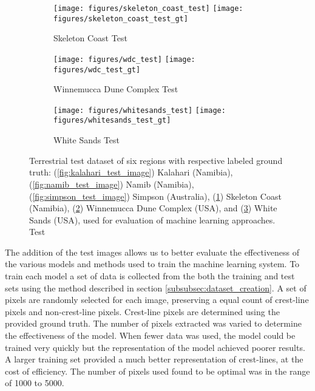 \begin{figure}
	\ContinuedFloat
	\centering
	\begin{subfigure}{\textwidth}
		\centering
		\texttt{[image: figures/skeleton\_coast\_test]}
		\texttt{[image: figures/skeleton\_coast\_test\_gt]}
		\caption{ Skeleton Coast Test }
		\label{fig:skeleton_coast_test_image}
	\end{subfigure}
	\begin{subfigure}{\textwidth}
		\centering
		\texttt{[image: figures/wdc\_test]}
		\texttt{[image: figures/wdc\_test\_gt]}
		\caption{ Winnemucca Dune Complex Test }
		\label{fig:wdc_test_image}
	\end{subfigure}
	\begin{subfigure}{\textwidth}
		\centering
		\texttt{[image: figures/whitesands\_test]}
		\texttt{[image: figures/whitesands\_test\_gt]}
		\caption{ White Sands Test }
		\label{fig:white_sands_test_image}
	\end{subfigure}
	\caption{Terrestrial test dataset of six regions with respective labeled ground truth: (\ref{fig:kalahari_test_image}) Kalahari (Namibia), (\ref{fig:namib_test_image}) Namib (Namibia), (\ref{fig:simpson_test_image}) Simpson (Australia), (\ref{fig:skeleton_coast_test_image}) Skeleton Coast (Namibia), (\ref{fig:wdc_test_image}) Winnemucca Dune Complex (USA), and (\ref{fig:white_sands_test_image}) White Sands (USA), used for evaluation of machine learning approaches. Test }
	\label{fig:terrestrial_test_dataset}
\end{figure}

The addition of the test images allows us to better evaluate the effectiveness of the various models and methods used to train the machine learning system. To train each model a set of data is collected from the both the training and test sets using the method described in section \ref{subsubsec:dataset_creation}. A set of pixels are randomly selected for each image, preserving a equal count of crest-line pixels and non-crest-line pixels. Crest-line pixels are determined using the provided ground truth. The number of pixels extracted was varied to determine the effectiveness of the model. When fewer data was used, the model could be trained very quickly but the representation of the model achieved poorer results. A larger training set provided a much better representation of crest-lines, at the cost of efficiency. The number of pixels used found to be optimal was in the range of 1000 to 5000.

